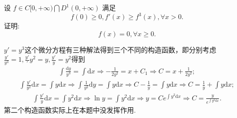 \documentclass[../../main.tex]{subfiles}%
\begin{document}
\begin{example}
设 \( f \in C[0,+\infty) \bigcap D^1(0,+\infty) \) 满足
\[
f(0) \geqslant 0, f'(x) \geqslant f^3(x), \forall x > 0.
\]
证明:
\[
f(x) = 0, \forall x \geqslant 0.
\]
\end{example}
\begin{note}
$y' = y^3$这个微分方程有三种解法得到三个不同的构造函数，即分别考虑$\frac{y'}{y^3}=1,\frac{y'}'{y^2}=y,\frac{y'}{y}=y^2$得到
\begin{align*}
\int{\frac{\mathrm{d}y}{y^3}}=\int{\mathrm{d}x}\Longrightarrow -\frac{1}{2y^2}=x+C_1\Longrightarrow C=x+\frac{1}{2y^2};
\end{align*}
\begin{align*}
\int{\frac{y\prime}{y^2}\mathrm{d}x}=\int{y\mathrm{d}x}\Longrightarrow \int{\frac{1}{y^2}\mathrm{d}y}=\int{y\mathrm{d}x}\Longrightarrow C-\frac{1}{y}=\int{y\mathrm{d}x}\Longrightarrow C=\frac{1}{y}+\int{y\mathrm{d}x};
\end{align*}
\begin{align*}
\int{\frac{y'}{y}\mathrm{d}x}=\int{y^2\mathrm{d}x}\Longrightarrow \ln y=\int{y^2\mathrm{d}x}\Longrightarrow y=Ce^{\int{y^2\mathrm{d}x}}\Longrightarrow C=\frac{y}{e^{\int{y^2\mathrm{d}x}}}.
\end{align*}
第二个构造函数实际上在本题中没发挥作用.
\end{note}
\end{document}
